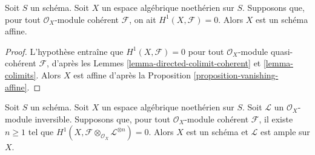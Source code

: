 \begin{lemma}
\label{lemma-Noetherian-h1-zero}
Soit $S$ un schéma. Soit $X$ un espace algébrique noethérien sur $S$.
Supposons que, pour tout $\mathcal{O}_X$-module cohérent
$\mathcal{F}$, on ait $H^1(X, \mathcal{F}) = 0$.
Alors $X$ est un schéma affine.
\end{lemma}

\begin{proof}
L'hypothèse entraîne que $H^1(X, \mathcal{F}) = 0$ pour tout
$\mathcal{O}_X$-module quasi-cohérent $\mathcal{F}$, d'après les
Lemmes \ref{lemma-directed-colimit-coherent} et \ref{lemma-colimits}.
Alors $X$ est affine d'après la
Proposition \ref{proposition-vanishing-affine}.
\end{proof}

\begin{lemma}
\label{lemma-Noetherian-h1-zero-invertible}
Soit $S$ un schéma. Soit $X$ un espace algébrique noethérien sur $S$.
Soit $\mathcal{L}$ un $\mathcal{O}_X$-module inversible.
Supposons que, pour tout $\mathcal{O}_X$-module cohérent
$\mathcal{F}$, il existe $n \geq 1$ tel que
$H^1(X, \mathcal{F} \otimes_{\mathcal{O}_X} \mathcal{L}^{\otimes n}) = 0$.
Alors $X$ est un schéma et $\mathcal{L}$ est ample sur $X$.
\end{lemma}

